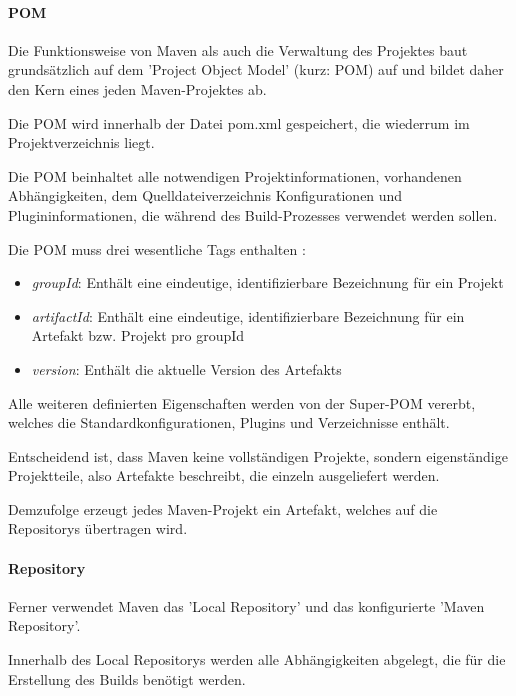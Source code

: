 \paragraph{POM}
Die Funktionsweise von Maven als auch die Verwaltung des Projektes baut grundsätzlich auf dem 'Project Object Model' (kurz: POM) auf und bildet daher den Kern eines jeden Maven-Projektes ab.

Die POM wird innerhalb der Datei pom.xml gespeichert, die wiederrum im Projektverzeichnis liegt.

Die POM beinhaltet alle notwendigen Projektinformationen, vorhandenen Abhängigkeiten, dem Quelldateiverzeichnis Konfigurationen und Plugininformationen, die während des Build-Prozesses verwendet werden sollen.\cite{the_apache_software_foundation_maven_2002}

Die POM muss drei wesentliche Tags enthalten \cite[S. 77 - 78]{spiller_maven_2011}: 

\begin{itemize}
    \item \textit{groupId}: Enthält eine eindeutige, identifizierbare Bezeichnung für ein Projekt
    \item \textit{artifactId}: Enthält eine eindeutige, identifizierbare Bezeichnung für ein Artefakt bzw. Projekt pro groupId
    \item \textit{version}: Enthält die aktuelle Version des Artefakts
\end{itemize}

Alle weiteren definierten Eigenschaften werden von der Super-POM vererbt, welches die Standardkonfigurationen, Plugins und Verzeichnisse enthält.

Entscheidend ist, dass Maven keine vollständigen Projekte, sondern eigenständige Projektteile, also Artefakte beschreibt, die einzeln ausgeliefert werden. \cite[S. 29]{spiller_maven_2011}

Demzufolge erzeugt jedes Maven-Projekt ein Artefakt, welches auf die Repositorys übertragen wird. 

\paragraph{Repository}

Ferner verwendet Maven das 'Local Repository' und das konfigurierte 'Maven Repository'.

Innerhalb des Local Repositorys werden alle Abhängigkeiten abgelegt, die für die Erstellung des Builds benötigt werden. 

